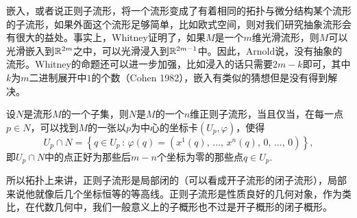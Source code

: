 

嵌入，或者说正则子流形，将一个流形变成了有着相同的拓扑与微分结构某个流形的子流形，如果外面这个流形足够简单，比如欧式空间，则对我们研究抽象流形会有很大的益处。事实上，Whitney证明了，如果$M$是一个$m$维光滑流形，则$M$可以光滑嵌入到$\mathbb{R}^{2m}$之中，可以光滑浸入到$\mathbb{R}^{2m-1}$中。因此，Arnold说，没有抽象的流形。Whitney的命题还可以进一步加强，比如浸入的话只需要$2m-k$即可，其中$k$为$m$二进制展开中$1$的个数（Cohen 1982），嵌入有类似的猜想但是没有得到解决。

\begin{thm}[正则子流形的结构定理]
设$N$是流形$M$的一个子集，则$N$是$M$的一个$n$维正则子流形，当且仅当，在每一点$p\in N$，可以找到$M$的一张以$p$为中心的坐标卡$(U_p,\varphi)$，使得
\[
	U_p\cap N=\left\{q\in U_p\,:\,\varphi(q)=\left(x^1(q)\text{, $\dots$, }x^n(q)\text{, }0\text{, $\dots$, }0\right)\right\},
\]
即$U_p\cap N$中的点正好为那些后$m-n$个坐标为零的那些点$q\in U_p$. 
\end{thm}

所以拓扑上来讲，正则子流形是局部闭的（可以看成开子流形的闭子流形），局部来说他就像后几个坐标恒等的等高线。正则子流形是性质良好的几何对象，作为类比，在代数几何中，我们一般意义上的子概形也不过是开子概形的闭子概形。

